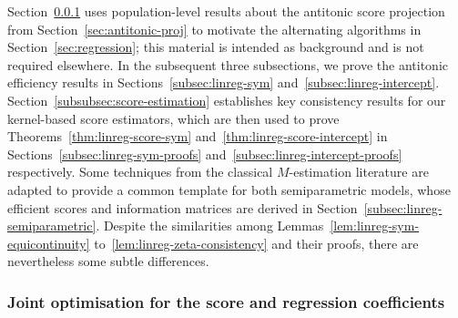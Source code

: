 \documentclass[a4paper]{article}
\theoremstyle{definition}
\begin{document}
Section~\ref{subsec:joint-opt} uses population-level results about the antitonic score projection from Section~\ref{sec:antitonic-proj} to motivate the alternating algorithms in Section~\ref{sec:regression}; this material is intended as background and is not required elsewhere. In the subsequent three subsections, we prove the antitonic efficiency results in Sections~\ref{subsec:linreg-sym} and~\ref{subsec:linreg-intercept}. Section~\ref{subsubsec:score-estimation} establishes key consistency results for our kernel-based score estimators, which are then used to prove Theorems~\ref{thm:linreg-score-sym} and~\ref{thm:linreg-score-intercept} in Sections~\ref{subsec:linreg-sym-proofs} and~\ref{subsec:linreg-intercept-proofs} respectively. Some techniques from the classical $M$-estimation literature are adapted to provide a common template for both semiparametric models, whose efficient scores and information matrices are derived in Section~\ref{subsec:linreg-semiparametric}. Despite the similarities among Lemmas~\ref{lem:linreg-sym-equicontinuity} to~\ref{lem:linreg-zeta-consistency} and their proofs, there are nevertheless some subtle differences.

\subsubsection{Joint optimisation for the score and regression coefficients}
\label{subsec:joint-opt}
\end{document}
